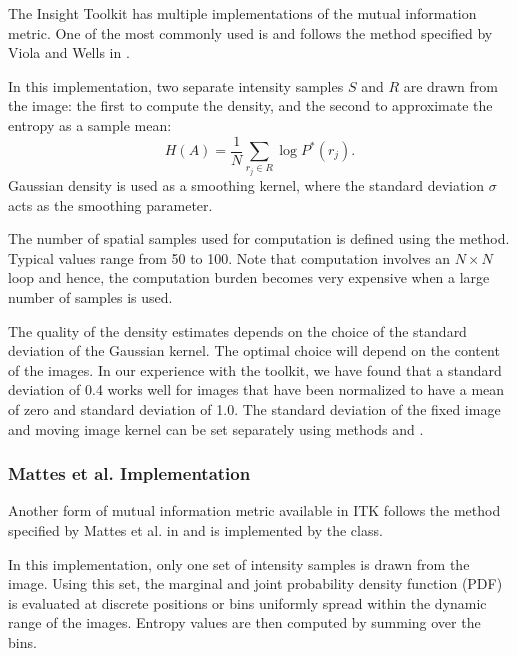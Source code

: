 The Insight Toolkit has multiple implementations of the mutual information
metric. One of the most commonly used is
 and follows the method specified
by Viola and Wells in \cite{Viola1997}.


In this implementation, two separate intensity samples $S$ and $R$ are drawn
from the image: the first to compute the density, and the second to approximate
the entropy as a sample mean:
\begin{equation}
H(A) = \frac{1}{N} \sum_{r_j \in R} \log P^{*}(r_j).
\end{equation}
Gaussian density is used as a smoothing kernel, where the standard deviation
$\sigma$ acts as the smoothing parameter.


The number of spatial samples used for computation is defined using
the  method. Typical values range from 50 to 100.
Note that computation involves an $N \times N$ loop and hence, the computation
burden becomes very expensive when a large number of samples is used.

The quality of the density estimates depends on the choice of the standard
deviation of the Gaussian kernel. The optimal choice will depend on the
content of the images.  In our experience with the toolkit, we have found
that a standard deviation of 0.4 works well for images that have been
normalized to have a mean of zero and standard deviation of 1.0. The standard
deviation of the fixed image and moving image kernel can be set separately
using methods
 and .

\subsubsection{Mattes et al. Implementation}
Another form of mutual information metric available in ITK follows the method
specified by Mattes et al. in \cite{Mattes2001} and is implemented by the
 class.

In this implementation, only one set of intensity samples is drawn from the
image.  Using this set, the marginal and joint probability density function
(PDF) is evaluated at discrete positions or bins uniformly spread within the
dynamic range of the images. Entropy values are then computed by summing over
the bins.


